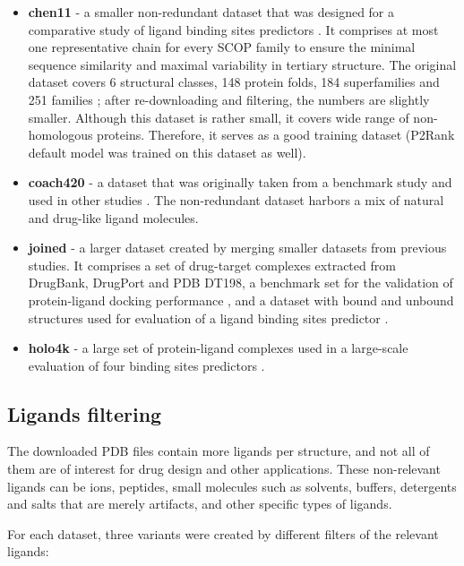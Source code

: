 \begin{itemize}
  \item \textbf{chen11}
  - a smaller non-redundant dataset that was designed for a comparative study of ligand binding sites predictors \cite{benchmark}. It comprises at most one representative chain for every SCOP family \cite{scop} to ensure the minimal sequence similarity and maximal variability in tertiary structure. The original dataset covers 6 structural classes, 148 protein folds, 184 superfamilies and 251 families \cite{benchmark}; after re-downloading and filtering, the numbers are slightly smaller. Although this dataset is rather small, it covers wide range of non-homologous proteins. Therefore, it serves as a good training dataset (P2Rank default model was trained on this dataset as well).
  
  \item \textbf{coach420}
  - a dataset that was originally taken from a benchmark study \cite{cofactor} and used in other studies \cite{coach, p2rank1}. The non-redundant dataset harbors a mix of natural and drug-like ligand molecules.
  
  \item \textbf{joined}
  - a larger dataset created by merging smaller datasets from previous studies. It comprises a set of drug-target complexes extracted from DrugBank, DrugPort and PDB DT198\cite{dt}, a benchmark set for the validation of protein-ligand docking performance \cite{astex}, and a dataset with bound and unbound structures used for evaluation of a ligand binding sites predictor \cite{ligsite}.
  
  \item \textbf{holo4k}
  - a large set of protein-ligand complexes used in a large-scale evaluation of four binding sites predictors \cite{holo4k}.
\end{itemize}


\subsection{Ligands filtering}

The downloaded PDB files contain more ligands per structure, and not all of them are of interest for drug design and other applications. These non-relevant ligands can be ions, peptides, small molecules such as solvents, buffers, detergents and salts that are merely artifacts, and other specific types of ligands.

For each dataset, three variants were created by different filters of the relevant ligands:

